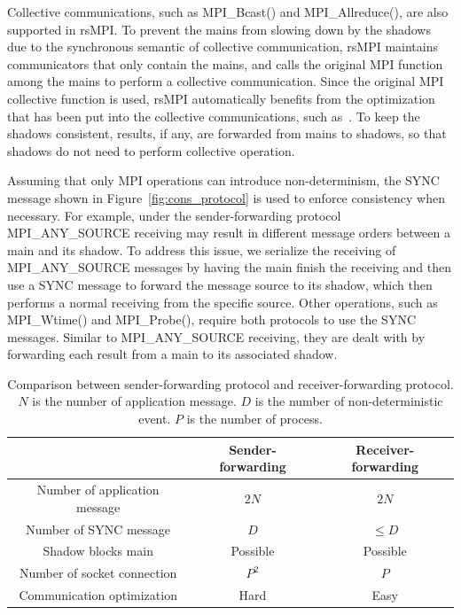 Collective communications, such as MPI\_Bcast() and MPI\_Allreduce(), are also supported in rsMPI. To prevent the mains from slowing down by the shadows due to the synchronous semantic of collective communication, rsMPI maintains communicators that only contain the mains, and calls the original MPI function among the mains to perform a collective communication. Since the original MPI collective function is used, rsMPI automatically benefits from the optimization that has been put into the collective communications, such as~\cite{thakur2005optimization}. To keep the shadows consistent, results, if any, are forwarded from mains to shadows, so that shadows do not need to perform collective operation.

Assuming that only MPI operations can introduce non-determinism, the SYNC message shown in Figure~\ref{fig:cons_protocol} is used to enforce consistency when necessary. For example, under the sender-forwarding protocol MPI\_ANY\_SOURCE receiving may result in different message orders between a main and its shadow. To address this issue, we serialize the receiving of MPI\_ANY\_SOURCE messages by having the main finish the receiving and then use a SYNC message to forward the message source to its shadow, which then performs a normal receiving from the specific source. Other operations, such as MPI\_Wtime() and MPI\_Probe(), require both protocols to use the SYNC messages. Similar to MPI\_ANY\_SOURCE receiving, they are dealt with by forwarding each result from a main to its associated shadow.

\begin{table}[!h]
\caption{Comparison between sender-forwarding protocol and receiver-forwarding protocol. $N$ is the number of application message. $D$ is the number of non-deterministic event. $P$ is the number of process.}
\centering
\begin{tabular}{|c | c | c |}
\hline 
 & Sender-forwarding  & Receiver-forwarding  \\
\hline \hline 
Number of application message  & $2N$ & $2N$ \\
\hline
Number of SYNC message & $D$ &  $\le D$ \\
\hline
Shadow blocks main & Possible & Possible \\
\hline
Number of socket connection & $P^2$ & $P$ \\
\hline
Communication optimization & Hard & Easy \\
\hline
\end{tabular}
\label{tbl:cons_protocol_comp}
\end{table}

